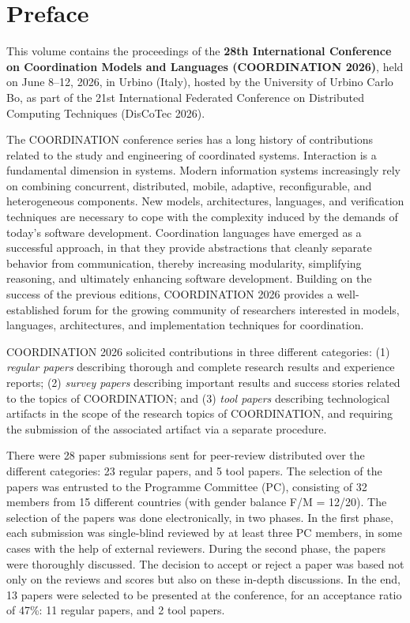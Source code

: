 \documentclass[]{llncs}
\begin{document}
\chapter*{Preface}

This volume contains the proceedings of the \textbf{28th International Conference on Coordination Models and Languages (COORDINATION 2026)}, held on June 8–12, 	 2026, in Urbino (Italy), hosted by the
University of Urbino Carlo Bo, as part of the 21st International Federated
Conference on Distributed Computing Techniques (DisCoTec 2026).

The COORDINATION conference series 
 has a long history of contributions
 related to the study and engineering of coordinated systems.
%
Interaction is a fundamental dimension in systems.
%
Modern information systems increasingly rely on combining concurrent, distributed,
mobile, adaptive, reconfigurable, and heterogeneous components. 
%
New models, architectures, languages, and verification techniques are necessary to cope with the complexity induced by the demands of today’s software development. 
%
Coordination languages
have emerged as a successful approach, in that they provide abstractions that cleanly
separate behavior from communication, thereby increasing modularity, simplifying
reasoning, and ultimately enhancing software development. 
%
Building on the success of	
the previous editions, COORDINATION 2026 provides a well-established forum for the
growing community of researchers interested in models, languages, architectures, and
implementation techniques for coordination.

COORDINATION 2026 solicited contributions in three different categories: (1) \emph{regular papers} describing thorough and complete research results and experience reports;
(2) \emph{survey papers} describing important results and success stories related to
the topics of COORDINATION; and (3) \emph{tool papers} describing technological artifacts
in the scope of the research topics of COORDINATION, and requiring the submission
of the associated artifact via a separate procedure.


There were 28 paper submissions sent for peer-review distributed over the different categories: 23 regular
papers, and 5 tool papers. The selection of the papers
was entrusted to the Programme Committee (PC), consisting of 32 members from 15
different countries (with gender balance F/M = 12/20). The selection of the papers was
done electronically, in two phases. In the first phase, %
 each
submission was single-blind reviewed by at least three PC members, in some cases with
the help of external reviewers. During the second phase, %
the papers were thoroughly discussed. 
%
The decision to accept or reject a paper
was based not only on the reviews and scores but also on these in-depth discussions. 
%
In
the end, 13 papers were selected to be presented at the conference, for an acceptance ratio of 47\%: 11 regular papers, and 2 tool papers. 
\end{document}
